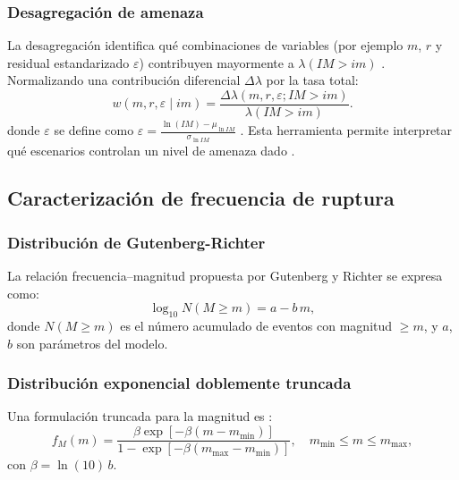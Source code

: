 \subsubsection{Desagregación de amenaza}

La desagregación identifica qué combinaciones de variables (por ejemplo \(m\), \(r\) y residual estandarizado \(\varepsilon\)) contribuyen mayormente a \(\lambda(IM>im)\) \cite{BazzurroCornell1999}. Normalizando una contribución diferencial \(\Delta\lambda\) por la tasa total:
\begin{equation}
w(m,r,\varepsilon \mid im) = \frac{\Delta\lambda(m,r,\varepsilon; IM>im)}{\lambda(IM>im)}.
\label{eq:hazard_deaggregation_weight}
\end{equation}
donde \(\varepsilon\) se define como \(\varepsilon = \frac{\ln(IM)-\mu_{\ln IM}}{\sigma_{\ln IM}}\) \cite{BakerCornell2005}. Esta herramienta permite interpretar qué escenarios controlan un nivel de amenaza dado \cite{BazzurroCornell1999}.

\subsection{Caracterización de frecuencia de ruptura}

\subsubsection{Distribución de Gutenberg-Richter}

La relación frecuencia--magnitud propuesta por Gutenberg y Richter \cite{GutenbergRichter1944} se expresa como:
\begin{equation}
\log_{10} N(M \geq m) = a - b\,m,
\label{eq:gutenberg_richter_v2}
\end{equation}
donde \(N(M\ge m)\) es el número acumulado de eventos con magnitud \(\ge m\), y \(a\), \(b\) son parámetros del modelo.

\subsubsection{Distribución exponencial doblemente truncada}

Una formulación truncada para la magnitud es \cite{CornellVanmarcke1969}:
\begin{equation}
f_M(m) = \frac{\beta \exp\left[-\beta (m - m_{\text{min}})\right]}{1 - \exp\left[-\beta (m_{\text{max}} - m_{\text{min}})\right]}, \quad m_{\text{min}} \leq m \leq m_{\text{max}},
\label{eq:doubly_truncated_exponential_v2}
\end{equation}
con \(\beta=\ln(10)\,b\).


